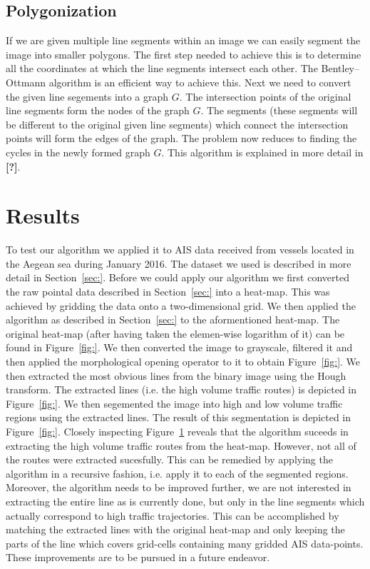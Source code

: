 \documentclass{article}
\begin{document}
\subsection{Polygonization}
If we are given multiple line segments within an image we can easily segment the image into smaller polygons. The first step needed to achieve this is to determine 
all the coordinates at which the line segments intersect each other. The Bentley–Ottmann algorithm is an efficient way to achieve this. Next we need to convert the given line 
segements into a graph $G$. The intersection points of the original line segments form the nodes of the graph $G$. The segments (these segments will be different to the original given line segments)
which connect the intersection points will form the edges of the graph. The problem now reduces to finding the cycles in the newly formed graph $G$. This algorithm is explained in more detail in \textbf{[?]}.

 
\section{Results}
To test our algorithm we applied it to AIS data received from vessels located in the Aegean sea during January 2016. The dataset we used is described 
in more detail in Section~\ref{sec:}. Before we could apply our algorithm we first converted the raw pointal data described in Section~\ref{sec:} into a heat-map.
This was achieved by gridding the data onto a two-dimensional grid. We then applied the algorithm as described in Section~\ref{sec:} to the aformentioned heat-map. 
The original heat-map (after having taken the elemen-wise logarithm of it) can be found in Figure~\ref{fig:}. We then converted the image to grayscale, filtered it and 
then applied the morphological opening operator to it to obtain Figure~\ref{fig:}. We then extracted the most obvious lines from the binary image using the Hough transform. The 
extracted lines (i.e. the high volume traffic routes) is depicted in Figure~\ref{fig:}. We then segemented the image into high and low volume traffic regions using the 
extracted lines. The result of this segmentation is depicted in Figure~\ref{fig:}. Closely inspecting Figure~\ref{} reveals that the algorithm suceeds in extracting the high volume traffic routes from the heat-map.
However, not all of the routes were extracted sucesfully. This can be remedied by applying the algorithm in a recursive fashion, i.e. apply it to each of the segmented regions. Moreover, 
the algorithm needs to be improved further, we are not interested in extracting the entire line as is currently done, but only in the line segments which actually correspond to high 
traffic trajectories. This can be accomplished by matching the extracted lines with the original heat-map and only keeping the parts of the line 
which covers grid-cells containing many gridded AIS data-points. These improvements are to be pursued in a future endeavor.
\end{document}

